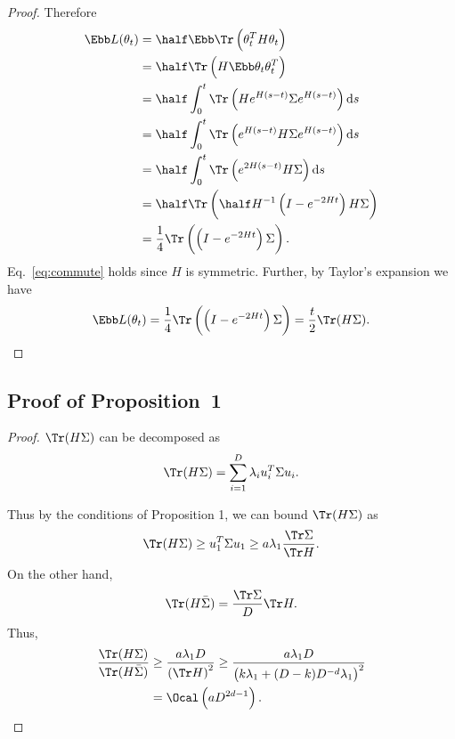 \documentclass{article}
\begin{document}
\begin{proof}
Therefore
\begin{align}
\Ebb L(\theta_t) &= \half \Ebb \Tr \left(\theta_t^T H \theta_t\right) \\
                 &= \half \Tr \left(H \Ebb\theta_t \theta_t^T\right) \\
                 &= \half \int_0^t \Tr \left(H e^{H(s-t)} \Sigma e^{H(s-t)}\right) \dif s \\
                 &= \half \int_0^t \Tr \left(e^{H(s-t)} H\Sigma e^{H(s-t)}\right) \dif s \label{eq:commute} \\
                 &= \half \int_0^t \Tr \left(e^{2H(s-t)} H\Sigma\right) \dif s \\
                 &= \half \Tr \left(\half H^{-1} \left(I-e^{-2Ht}\right) H\Sigma\right) \\
                 &= \frac{1}{4} \Tr \left( \left(I-e^{-2Ht}\right)\Sigma\right).
\end{align}
Eq.~\eqref{eq:commute} holds since $H$ is symmetric.
Further, by Taylor's expansion we have
\begin{equation}
    \Ebb L(\theta_t) = \frac{1}{4} \Tr \left( \left(I-e^{-2Ht}\right)\Sigma\right) =\frac{t}{2}\Tr(H\Sigma).
\end{equation}
\end{proof}

\subsection{Proof of Proposition~1}
\begin{proof}
$\Tr(H\Sigma)$ can be decomposed as
\begin{equation}
\Tr(H\Sigma) = \sum_{i=1}^D \lambda_i u_i^T \Sigma u_i.
\end{equation}

Thus by the conditions of Proposition 1, we can bound $\Tr(H\Sigma)$ as
\begin{equation}
    \Tr(H\Sigma) \ge u_1^T \Sigma u_1\ge a\lambda_1\frac{\Tr \Sigma}{\Tr H}.
\end{equation}
On the other hand,
\begin{equation}
    \Tr(H\bar{\Sigma}) = \frac{\Tr\Sigma}{D}\Tr H.
\end{equation}
Thus,
\begin{equation}
\begin{aligned}
    \frac{\Tr(H\Sigma)}{\Tr(H\bar{\Sigma})} &\ge \frac{a \lambda_1 D}{\left(\Tr H\right)^2} \ge \frac{a \lambda_1 D}{\left(k\lambda_1 + (D-k)D^{-d}\lambda_1\right)^2} \\
    &= \Ocal\left(aD^{2d-1}\right).
\end{aligned}
\end{equation}
\end{proof}
\end{document}

